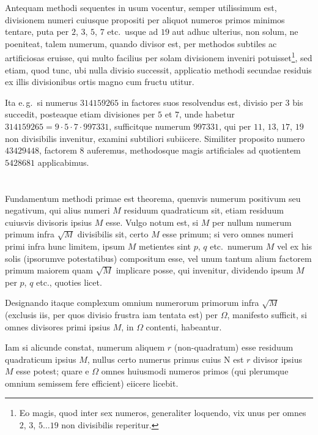 \documentclass[12pt,a4paper]{article}
\theoremstyle{plain}
\theoremstyle{definition}
\theoremstyle{remark}
\newcommand{\NR}{\mathrm{N}}
\begin{document}
Antequam methodi sequentes in usum vocentur, semper utilissimum est, divisionem numeri cuiusque propositi per aliquot numeros primos minimos tentare, puta per $2$, $3$, $5$, $7$ etc.\ usque ad $19$ aut adhuc ulterius, non solum, ne poeniteat, talem numerum, quando divisor est, per methodos subtiles ac artificiosas eruisse, qui multo facilius per solam divisionem inveniri potuisset\footnote{Eo magis, quod inter sex numeros, generaliter loquendo, vix unus per omnes $2$, $3$, $5\ldots 19$ non divisibilis reperitur.}, sed etiam, quod tunc, ubi nulla divisio successit, applicatio methodi secundae residuis ex illis divisionibus ortis magno cum fructu utitur.

Ita e.\,g.\ si numerus $314159265$ in factores suos resolvendus est, divisio per $3$ bis succedit, posteaque etiam divisiones per $5$ et $7$, unde habetur $314159265=9\cdot 5\cdot 7\cdot 997331$, sufficitque numerum $997331$, qui per $11$, $13$, $17$, $19$ non divisibilis invenitur, examini subtiliori subiicere. Similiter proposito numero $43429448$, factorem $8$ auferemus, methodosque magis artificiales ad quotientem $5428681$ applicabimus.

\section{}

Fundamentum methodi primae est theorema, quemvis numerum positivum seu negativum, qui alius numeri $M$ residuum quadraticum sit, etiam residuum cuiusvis divisoris ipsius $M$ esse. Vulgo notum est, si $M$ per nullum numerum primum infra $\surd M$ divisibilis sit, certo $M$ esse primum; si vero omnes numeri primi infra hunc limitem, ipsum $M$ metientes sint $p$, $q$ etc.\ numerum $M$ vel ex his solis (ipsorumve potestatibus) compositum esse, vel unum tantum alium factorem primum maiorem quam $\surd M$ implicare posse, qui invenitur, dividendo ipsum $M$ per $p$, $q$ etc., quoties licet.

Designando itaque complexum omnium numerorum primorum infra $\surd M$ (exclusis iis, per quos divisio frustra iam tentata est) per $\Omega$, manifesto sufficit, si omnes divisores primi ipsius $M$, in $\Omega$ contenti, habeantur.

Iam si alicunde constat, numerum aliquem $r$ (non-quadratum) esse residuum quadraticum ipsius $M$, nullus certo numerus primus cuius $\NR$ est $r$ divisor ipsius $M$ esse potest; quare e $\Omega$ omnes huiusmodi numeros primos (qui plerumque omnium semissem fere efficient) eiicere licebit.
\end{document}
